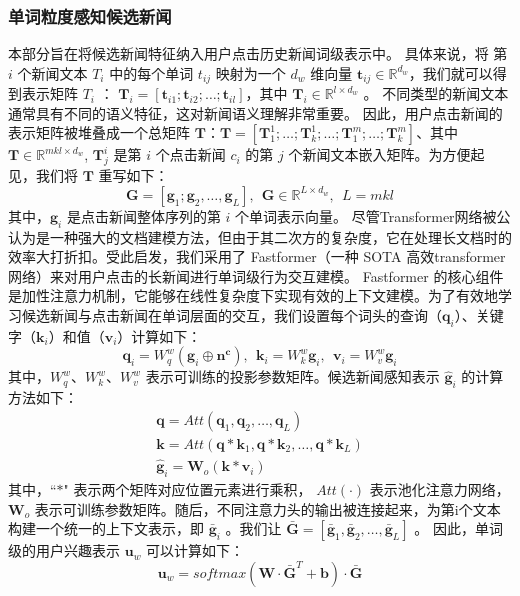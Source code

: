 \documentclass[withoutpreface,bwprint]{cumcmthesis} %
\begin{document}
	\subsubsection{ 单词粒度感知候选新闻}
	本部分旨在将候选新闻特征纳入用户点击历史新闻词级表示中。
	具体来说，将 第$i$ 个新闻文本 $T_i$ 中的每个单词 $t_{ij}$ 映射为一个 $d_w$ 维向量 $\mathbf{t}_{ij} \in \mathbb{R}^{d_w}$，我们就可以得到表示矩阵  $T_i$ ： $\mathbf{T}_i = [\mathbf{t}_{i1}; \mathbf{t}_{i2}; \dots; \mathbf{t}_{il}]$，其中 $\mathbf{T}_i \in \mathbb{R}^{l \times d_w}$ 。
	不同类型的新闻文本通常具有不同的语义特征，这对新闻语义理解非常重要。 因此，用户点击新闻的表示矩阵被堆叠成一个总矩阵 $\mathbf{T}$：$\mathbf{T} =[\mathbf{T} _1^1;\ldots;\mathbf{T} _k^1;\ldots;\mathbf{T} _1^m;\ldots;\mathbf{T} _k^m]$、其中 $\mathbf{T} \in \mathbb{R}^{mkl \times d_w}$, $\mathbf{T}_j^i$ 是第 $i$  个点击新闻 $c_i$ 的第 $j$ 个新闻文本嵌入矩阵。为方便起见，我们将 $\mathbf{T}$ 重写如下：
	\begin{equation}
	\mathbf{G} = [\mathbf{g}_1; \mathbf{g}_2, \dots, \mathbf{g}_L],~~ \mathbf{G} \in \mathbb{R}^{L\times d_w},~~L = mkl
	\end{equation}
	其中，$\mathbf{g}_i$ 是点击新闻整体序列的第 $i$ 个单词表示向量。
	尽管Transformer网络被公认为是一种强大的文档建模方法，但由于其二次方的复杂度，它在处理长文档时的效率大打折扣。受此启发，我们采用了 Fastformer（一种 SOTA 高效transformer网络）来对用户点击的长新闻进行单词级行为交互建模。 Fastformer 的核心组件是加性注意力机制，它能够在线性复杂度下实现有效的上下文建模。为了有效地学习候选新闻与点击新闻在单词层面的交互，我们设置每个词头的查询（$\mathbf{q}_i$）、关键字（$\mathbf{k}_i$）和值（$\mathbf{v}_i$）计算如下：	
	\begin{equation}
	\mathbf{q}_i = W^w_q(\mathbf{g}_i \oplus \mathbf{n^c}),~~
	\mathbf{k}_i = W^w_k\mathbf{g}_i,~~
	\mathbf{v}_i = W^w_v\mathbf{g}_i
	\end{equation}
	其中，$W^w_q$、$W^w_k$、$W^w_v$ 表示可训练的投影参数矩阵。候选新闻感知表示 $\hat{\mathbf{g}}_i$ 的计算方法如下：
	\begin{equation}\label{wcan}
	\begin{split}
	\mathbf{q} = Att(\mathbf{q}_1, \mathbf{q}_2, \dots, \mathbf{q}_L)\\
	\mathbf{k} = Att(\mathbf{q} * \mathbf{k}_1, \mathbf{q} * \mathbf{k}_2, \dots, \mathbf{q} * \mathbf{k}_L)\\
	\hat{\mathbf{g}}_i = \mathbf{W}_o(\mathbf{k} * \mathbf{v}_i)
	\end{split}
	\end{equation}
	其中，``$*$" 表示两个矩阵对应位置元素进行乘积， $Att(\cdot)$ 表示池化注意力网络，$\mathbf{W}_o$ 表示可训练参数矩阵。随后，不同注意力头的输出被连接起来，为第i个文本构建一个统一的上下文表示，即 $\bar{\mathbf{g}}_i$ 。我们让  $\bar{\mathbf{G}}= [\bar{\mathbf{g}}_1,\bar{\mathbf{g}}_2, \ldots,  \bar{\mathbf{g}} _L]$ 。
	 因此，单词级的用户兴趣表示 $\mathbf{u}_w$ 可以计算如下：
	\begin{equation}
	\mathbf{u} _w = softmax( \mathbf{W} \cdot \mathbf{\bar{G}}^{T} + \mathbf{b}) \cdot \mathbf{\bar{G}}
	\end{equation}
\end{document}
